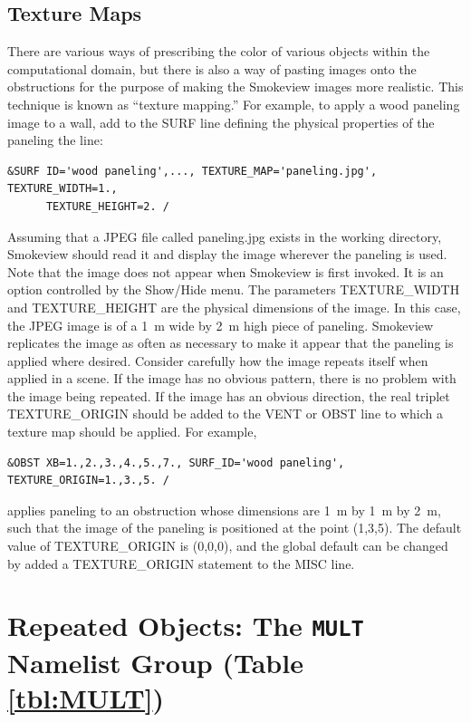 \documentclass[11pt]{book}
\begin{document}
\subsection{Texture Maps}
\label{info:texture_map}

There are various ways of prescribing the color of various objects
within the computational domain, but there is also a way of pasting
images onto the obstructions for the purpose of making the Smokeview
images more realistic. This technique is known as ``texture mapping.''
For example, to apply a wood paneling image to a wall,
add to the {\ct SURF} line defining the physical properties of the
paneling the line:
\begin{lstlisting}
&SURF ID='wood paneling',..., TEXTURE_MAP='paneling.jpg', TEXTURE_WIDTH=1.,
      TEXTURE_HEIGHT=2. /
\end{lstlisting}
Assuming that a JPEG file called {\ct paneling.jpg} exists in the
working directory, Smokeview should read it and display the image
wherever the paneling is used.
Note that the image does not appear when Smokeview is first invoked. It is an option controlled by
the {\ct Show/Hide} menu. The parameters {\ct TEXTURE\_WIDTH}
and {\ct TEXTURE\_HEIGHT} are the physical dimensions of the image. In this case,
the JPEG image is of a 1~m wide by 2~m high piece of
paneling. Smokeview replicates the image as often as necessary to
make it appear that the paneling is applied where desired.
Consider carefully how the image repeats itself when
applied in a scene. If the image has no obvious pattern, there is no
problem with the image being repeated. If the image has an obvious
direction, the real triplet {\ct TEXTURE\_ORIGIN} should be added to
the {\ct VENT} or {\ct OBST} line to which a texture map
should be applied. For example,

\begin{lstlisting}
&OBST XB=1.,2.,3.,4.,5.,7., SURF_ID='wood paneling', TEXTURE_ORIGIN=1.,3.,5. /
\end{lstlisting}
applies paneling to an obstruction whose dimensions are 1~m by 1~m by 2~m, such that the image of the paneling is positioned at the point (1,3,5). The default value of {\ct TEXTURE\_ORIGIN} is (0,0,0), and the global default can be changed by added a {\ct TEXTURE\_ORIGIN} statement to the {\ct MISC} line.




\section{Repeated Objects: The \texorpdfstring{{\tt MULT}}{MULT} Namelist Group (Table \ref{tbl:MULT})}
\label{info:MULT}
\end{document}
